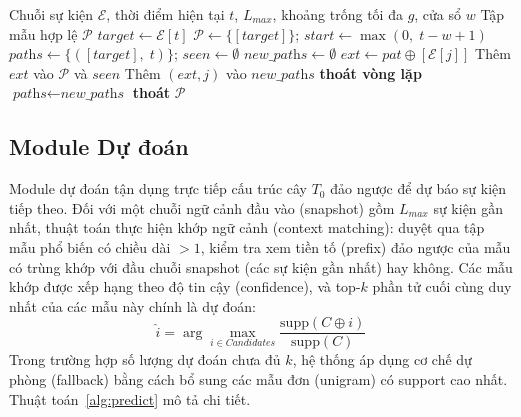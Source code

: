 \documentclass[conference]{IEEEtran}
\begin{document}
\begin{algorithm}[htbp]
\caption{Sinh mẫu Gap-Aware Episode}
\label{alg:gap}
\begin{algorithmic}[1]
\REQUIRE Chuỗi sự kiện $\mathcal{E}$, thời điểm hiện tại $t$, $L_{max}$, khoảng trống tối đa $g$, cửa sổ $w$
\ENSURE Tập mẫu hợp lệ $\mathcal{P}$
\STATE $\textit{target} \leftarrow \mathcal{E}[t]$
\STATE $\mathcal{P} \leftarrow \{[\textit{target}]\}$; $\textit{start} \leftarrow \max(0,\; t - w + 1)$
\STATE $\textit{paths} \leftarrow \{([\textit{target}],\; t)\}$; $\textit{seen} \leftarrow \emptyset$
    \STATE $\textit{new\_paths} \leftarrow \emptyset$
            \STATE $\textit{ext} \leftarrow \textit{pat} \oplus [\mathcal{E}[j]]$ 
                \STATE Thêm $\textit{ext}$ vào $\mathcal{P}$ và $\textit{seen}$
                \STATE Thêm $(\textit{ext}, j)$ vào $\textit{new\_paths}$
            \ENDIF
                \STATE \textbf{thoát vòng lặp} 
            \ENDIF
        \ENDFOR
    \ENDFOR
    \STATE $\textit{paths} \leftarrow \textit{new\_paths}$
        \STATE \textbf{thoát}
    \ENDIF
\ENDFOR
\RETURN $\mathcal{P}$
\end{algorithmic}
\end{algorithm}

\subsection{Module Dự đoán}
Module dự đoán tận dụng trực tiếp cấu trúc cây $T_0$ đảo ngược để dự báo sự kiện tiếp theo. Đối với một chuỗi ngữ cảnh đầu vào (snapshot) gồm $L_{max}$ sự kiện gần nhất, thuật toán thực hiện khớp ngữ cảnh (context matching): duyệt qua tập mẫu phổ biến có chiều dài $> 1$, kiểm tra xem tiền tố (prefix) đảo ngược của mẫu có trùng khớp với đầu chuỗi snapshot (các sự kiện gần nhất) hay không. Các mẫu khớp được xếp hạng theo độ tin cậy (confidence), và top-$k$ phần tử cuối cùng duy nhất của các mẫu này chính là dự đoán:
\begin{equation}
    \hat{i} = \arg\max_{i \in \textit{Candidates}} \frac{\text{supp}(C \oplus i)}{\text{supp}(C)}
\end{equation}
Trong trường hợp số lượng dự đoán chưa đủ $k$, hệ thống áp dụng cơ chế dự phòng (fallback) bằng cách bổ sung các mẫu đơn (unigram) có support cao nhất. Thuật toán~\ref{alg:predict} mô tả chi tiết.
\end{document}
